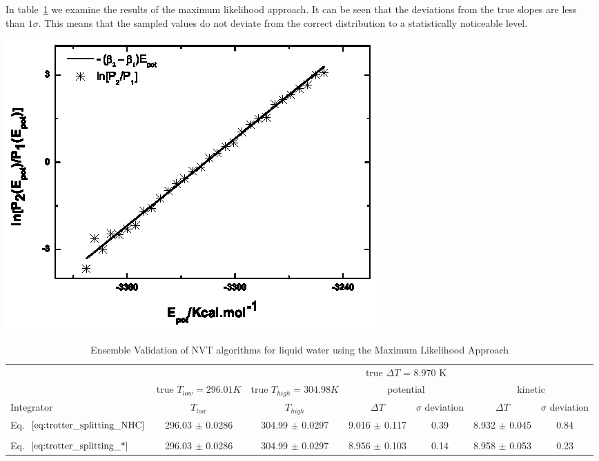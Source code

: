 \documentclass[aip,jcp,reprint,amsmath,amssymb]{revtex4-1}
\begin{document}
In table~\ref{table:ensemblevalidation} we examine the results of the maximum likelihood approach. It can be seen that the deviations from the true slopes are less than $1\sigma$. This means that the sampled values do not deviate from the correct distribution to a statistically noticeable level.

\begin{center}
\includegraphics{checkensemble}
\label{fig:checkensemble}
\end{center}

\begin{widetext}
\begin{table}[h]
\setlength{\tabcolsep}{7pt}
\caption{Ensemble Validation of NVT algorithms for liquid water using the Maximum Likelihood Approach}
\label{table:ensemblevalidation}
\centering %
\begin{tabular}{l c  c  c  c  c  c }  
\hline
& & & \multicolumn{2}{c}{true $\Delta T$ = 8.970 K}\\
\cline{4-7}
 &true $T_{low} = 296.01 K$ &true $T_{high} = 304.98 K$& \multicolumn{2}{c}{potential} & \multicolumn{2}{c}{kinetic}\\
\hline
Integrator &$T_{low}$  &$T_{high}$ &$\Delta T$ &$\sigma$ deviation &$\Delta T$&$\sigma$ deviation\\
\hline %
 Eq.~$\ref{eq:trotter_splitting_NHC}$   & 296.03 $\pm$ 0.0286 & 304.99 $\pm$ 0.0297 & 9.016 $\pm$ 0.117 & 0.39 & 8.932 $\pm$ 0.045 & 0.84 \\
  \\ [0.5ex]
 Eq.~$\ref{eq:trotter_splitting_*}$ & 296.03 $\pm$ 0.0286 & 304.99 $\pm$ 0.0297 & 8.956 $\pm$ 0.103 & 0.14 & 8.958 $\pm$ 0.053 & 0.23\\
  \hline
\end{tabular}
\end{table}
\end{widetext}
\end{document}
